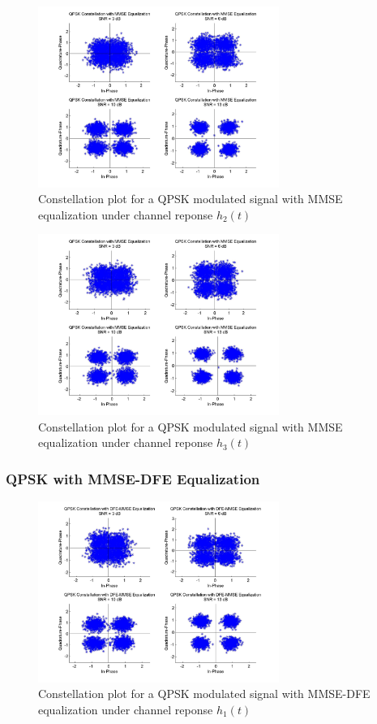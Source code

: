 \documentclass[]{article}
\begin{document}
\begin{figure}[H]
\centering
\includegraphics[width=0.7\textwidth]{qpConstMMSE2.jpg}
\caption{Constellation plot for a QPSK modulated signal with MMSE equalization under channel reponse $h_2(t)$}
\end{figure}

\begin{figure}[H]
\centering
\includegraphics[width=0.7\textwidth]{qpConstMMSE3.jpg}
\caption{Constellation plot for a QPSK modulated signal with MMSE equalization under channel reponse $h_3(t)$}
\end{figure}

\subsubsection{QPSK with MMSE-DFE Equalization}

\begin{figure}[H]
\centering
\includegraphics[width=0.7\textwidth]{qpConstDFEMMSE1.jpg}
\caption{Constellation plot for a QPSK modulated signal with MMSE-DFE equalization under channel reponse $h_1(t)$}
\end{figure}
\end{document}

